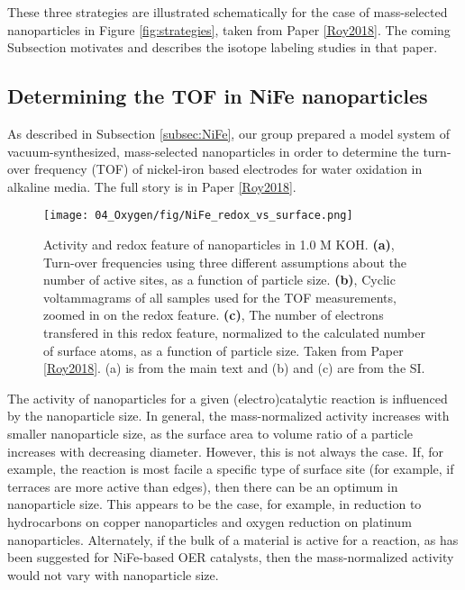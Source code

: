 These three strategies are illustrated schematically for the case of mass-selected nanoparticles in Figure \ref{fig:strategies}, taken from Paper \ref{Roy2018}. The coming Subsection motivates and describes the isotope labeling studies in that paper.

\subsection{Determining the TOF in NiFe nanoparticles}

As described in Subsection \ref{subsec:NiFe}, our group prepared a model system of vacuum-synthesized, mass-selected  nanoparticles in order to determine the turn-over frequency (TOF) of nickel-iron based electrodes for water oxidation in alkaline media. The full story is in Paper \ref{Roy2018}. 

\begin{figure}[h!]
	\centering
	\texttt{[image: 04\_Oxygen/fig/NiFe\_redox\_vs\_surface.png]}
	\caption{Activity and redox feature of  nanoparticles in 1.0 M KOH. \textbf{(a)}, Turn-over frequencies using three different assumptions about the number of active sites, as a function of particle size. \textbf{(b)}, Cyclic voltammagrams of all samples used for the TOF measurements, zoomed in on the redox feature. \textbf{(c)}, The number of electrons transfered in this redox feature, normalized to the calculated number of surface atoms, as a function of particle size. Taken from Paper \ref{Roy2018}. (a) is from the main text and (b) and (c) are from the SI.}
	\label{fig:redox_vs_surf}
\end{figure}

The activity of nanoparticles for a given (electro)catalytic reaction is influenced by the nanoparticle size\cite{Mistry2016b}. In general, the mass-normalized activity increases with smaller nanoparticle size, as the surface area to volume ratio of a particle increases with decreasing diameter. However, this is not always the case. If, for example, the reaction is most facile a specific type of surface site (for example, if terraces are more active than edges), then there can be an optimum in nanoparticle size. This appears to be the case, for example, in  reduction to hydrocarbons on copper nanoparticles\cite{Reske2014} and oxygen reduction on platinum nanoparticles\cite{Hernandez-Fernandez2014}. Alternately, if the bulk of a material is active for a reaction, as has been suggested for NiFe-based OER catalysts\cite{Batchellor2015, Doyle2017}, then the mass-normalized activity would not vary with nanoparticle size.

